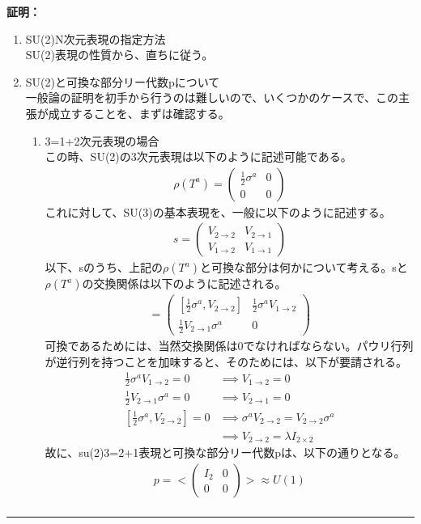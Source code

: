 \documentclass[dvipdfmx,a4paper,10.5pt]{article}
\numberwithin{equation}{section}
\newenvironment{proofbox}
{\begin{prooflabel}\textbf{証明：}\end{prooflabel}\vspace{0.8em}}
{\par\vspace{1em}\hrule\vspace{1em}}
\begin{document}
\begin{proofbox}
\begin{enumerate}
    \item SU(2)N次元表現の指定方法\\
    SU(2)表現の性質から、直ちに従う。
    \item SU(2)と可換な部分リー代数pについて\\
    一般論の証明を初手から行うのは難しいので、いくつかのケースで、この主張が成立することを、まずは確認する。
    \begin{enumerate}
        \item 3=1+2次元表現の場合\\
        この時、SU(2)の3次元表現は以下のように記述可能である。
        \begin{align*}
            \rho(T^{a})=
            \begin{pmatrix}
           \frac{1}{2}\sigma^{a} & 0 \\0 & 0
            \end{pmatrix}
        \end{align*}
        これに対して、SU(3)の基本表現を、一般に以下のように記述する。
        \begin{align*}
            s=\begin{pmatrix}
           V_{2\to 2} & V_{2\to1} \\V_{1\to 2} & V_{1\to 1}
            \end{pmatrix}
        \end{align*}
        以下、sのうち、上記の$\rho(T^{a})$と可換な部分は何かについて考える。sと$\rho(T^{a})$の交換関係は以下のように記述される。
        \begin{align*}
            [s,\rho(T^{a})]=\begin{pmatrix}
           [\frac{1}{2}\sigma^{a},V_{2\to 2}] & \frac{1}{2}\sigma^{a}V_{1\to 2} \\ \frac{1}{2}V_{2\to 1}\sigma^{a}& 0
            \end{pmatrix}
        \end{align*}
        可換であるためには、当然交換関係は0でなければならない。パウリ行列が逆行列を持つことを加味すると、そのためには、以下が要請される。
        \begin{align*}
            \frac{1}{2}\sigma^{a}V_{1\to 2}=0&\implies V_{1\to 2}=0\\
            \frac{1}{2}V_{2\to 1}\sigma^{a}=0&\implies V_{2\to1}=0\\
            [\frac{1}{2}\sigma^{a},V_{2\to 2}]=0&\implies \sigma^{a}V_{2\to 2}=V_{2\to 2}\sigma^{a}\\
            &\implies V_{2\to2 }=\lambda I_{2\times 2}
        \end{align*}
        故に、su(2)3=2+1表現と可換な部分リー代数pは、以下の通りとなる。
        \begin{align*}
            p=<\begin{pmatrix}
           I_{2} & 0 \\ 0& 0
            \end{pmatrix}> \approx U(1)\\
        \end{align*}


\end{enumerate}
\end{enumerate}
\end{proofbox}
\end{document}
